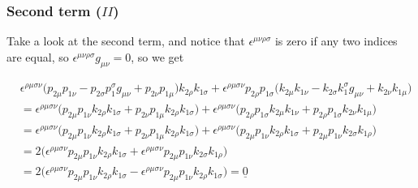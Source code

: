 \documentclass[11pt]{article}
\begin{document}
\subsubsection{Second term ($II$)}
\begin{center}
Take a look at the second term, and notice that $\epsilon^{\mu\nu \rho \sigma}$ is zero if any two indices are equal, so $\epsilon^{\mu \nu \rho \sigma} g_{\mu \nu}=0$, so we get
\begin{flushleft}
\begin{align*}
&  \epsilon^{\rho \mu \sigma \nu}  \big(
p_{2\mu} p_{1 \nu} - p_{2\sigma} p_1^{ \sigma} g_{\mu\nu}
+ p_{2\nu} p_{1 \mu} \big) k_{2 \rho} k_{1 \sigma} 
+ \epsilon^{\rho \mu \sigma \nu} p_{2 \rho}  p_{1 \sigma}  \big(k_{2 \mu} k_{1 \nu}  - k_{2 \sigma} k_1^{ \sigma} g_{\mu \nu} + k_{2 \nu} k_{1 \mu}\big) \\
&= \epsilon^{\rho \mu \sigma \nu}  \big(
p_{2\mu} p_{1 \nu}k_{2 \rho} k_{1 \sigma} 
+ p_{2\nu} p_{1 \mu} k_{2 \rho} k_{1 \sigma} \big) + \epsilon^{\rho \mu \sigma \nu} \big(
 p_{2 \rho}  p_{1 \sigma} k_{2 \mu} k_{1 \nu}  + p_{2 \rho}  p_{1 \sigma}  k_{2 \nu} k_{1 \mu}\big) \\
&= \epsilon^{\rho \mu \sigma \nu}  \big(
p_{2\mu} p_{1 \nu}k_{2 \rho} k_{1 \sigma} 
+ p_{2\nu} p_{1 \mu} k_{2 \rho} k_{1 \sigma} \big) + \epsilon^{\rho \mu  \sigma \nu } \big(
p_{2 \mu}  p_{1 \nu} k_{2 \rho} k_{1 \sigma}  + p_{2 \mu}  p_{1 \nu}  k_{2 \sigma} k_{1 \rho}\big) \\
&= 2 \big( \epsilon^{\rho \mu  \sigma \nu } 
p_{2 \mu}  p_{1 \nu} k_{2 \rho} k_{1 \sigma}  + \epsilon^{\rho \mu  \sigma \nu } p_{2 \mu}  p_{1 \nu}  k_{2 \sigma} k_{1 \rho}\big) \\
&= 2 \big( \epsilon^{\rho \mu  \sigma \nu } 
p_{2 \mu}  p_{1 \nu} k_{2 \rho} k_{1 \sigma}  
- \epsilon^{\rho \mu  \sigma \nu } p_{2 \mu}  p_{1 \nu}  k_{2 \rho} k_{1 \sigma}\big) = \underline{0} \\
\end{align*}
\end{flushleft}
\end{center}
\end{document}
